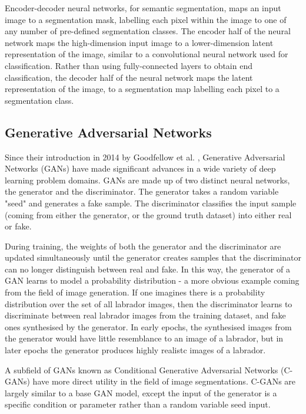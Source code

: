 Encoder-decoder neural networks, for semantic segmentation, maps an input image
to a segmentation mask, labelling each pixel within the image to one of any
number of pre-defined segmentation classes. The encoder half of the neural
network maps the high-dimension input image to a lower-dimension latent
representation of the image, similar to a convolutional neural network used for
classification. Rather than using fully-connected layers to obtain end
classification, the decoder half of the neural network maps the latent
representation of the image, to a segmentation map labelling each pixel to a
segmentation class. \newline

\subsection{Generative Adversarial Networks}

Since their introduction in 2014 by Goodfellow et al.
\cite{goodfellowGenerativeAdversarialNets2014}, Generative Adversarial Networks
(GANs) have made significant advances in a wide variety of deep learning problem
domains. GANs are made up of two distinct neural networks, the generator and
the discriminator. The generator takes a random variable "seed" and generates a
fake sample. The discriminator classifies the input sample (coming from either
the generator, or the ground truth dataset) into either real or fake.
\newline

During training, the weights of both the generator and the discriminator are
updated simultaneously until the generator creates samples that the
discriminator can no longer distinguish between real and fake. In this way, the
generator of a GAN learns to model a probability distribution - a more obvious
example coming from the field of image generation. If one imagines there is a
probability distribution over the set of all labrador images, then the
discriminator learns to discriminate between real labrador images
from the training dataset, and fake ones synthesised by the generator.
In early epochs, the synthesised images from the generator would have little
resemblance to an image of a labrador, but in later epochs the generator produces highly realistc images of a labrador. \newline

A subfield of GANs known as Conditional Generative Adversarial Networks (C-GANs)
have more direct utility in the field of image segmentations. C-GANs are largely
similar to a base GAN model, except the input of the generator is a specific
condition or parameter rather than a random variable seed input. \newline

